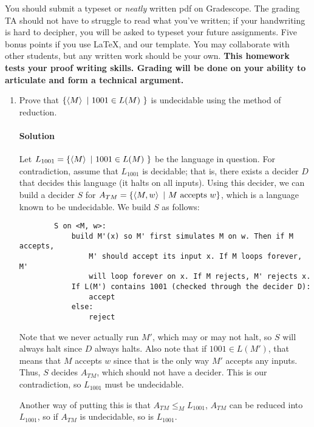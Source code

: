 \documentclass[11pt]{article}
\newcommand{\solution}[1]{\paragraph{Solution}  }
\begin{document}

You should submit a typeset or \emph{neatly} written pdf on Gradescope.  The grading TA should not have to struggle to read what you've written; if your handwriting is hard to decipher, you will be asked to typeset your future assignments. Five bonus points if you use \LaTeX, and our template. You may collaborate with other students, but any written work should be your own. \textbf{This homework tests your proof writing skills. Grading will be done on your ability to articulate and form a technical argument.}

\begin{enumerate}
    \item Prove that $\{\braket{M} ~|~ 1001 \in L(M) ~\}$ is undecidable using the method of reduction.

    \solution{} Let $L_{1001} = \{\braket{M} ~|~ 1001 \in L(M) ~\}$ be the language in question. For contradiction, assume that $L_{1001}$ is decidable; that is, there exists a decider $D$ that decides this language (it halts on all inputs). Using this decider, we can build a decider $S$ for $A_{TM} = \{\braket{M, w} ~|~ M \text{ accepts } w\}$, which is a language known to be undecidable. We build $S$ as follows:

    \begin{verbatim}
        S on <M, w>:
            build M'(x) so M' first simulates M on w. Then if M accepts,
                M' should accept its input x. If M loops forever, M'
                will loop forever on x. If M rejects, M' rejects x.
            If L(M') contains 1001 (checked through the decider D):
                accept
            else:
                reject
    \end{verbatim}

    Note that we never actually run $M'$, which may or may not halt, so $S$ will always halt since $D$ always halts. Also note that if $1001 \in L(M')$, that means that $M$ accepts $w$ since that is the only way $M'$ accepts any inputs. Thus, $S$ decides $A_{TM}$, which should not have a decider. This is our contradiction, so $L_{1001}$ must be undecidable.

    Another way of putting this is that $A_{TM} \leq_M L_{1001}$, $A_{TM}$ can be reduced into $L_{1001}$, so if $A_{TM}$ is undecidable, so is $L_{1001}$.
    

\end{enumerate}
\end{document}
